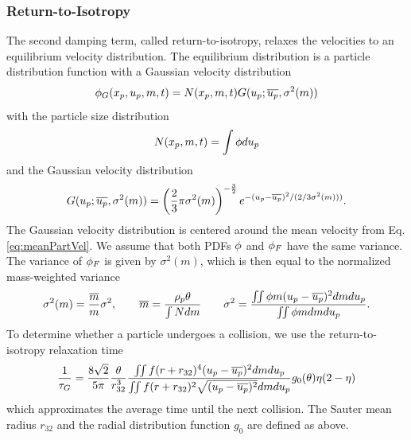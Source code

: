 \subsubsection{Return-to-Isotropy}
\label{sec:isotropy}
The second damping term, called return-to-isotropy, relaxes the velocities to an equilibrium velocity distribution. The equilibrium distribution is a particle distribution function with a Gaussian velocity distribution
\begin{equation*}
    \phi_G(x_p,u_p,m,t) = N(x_p,m,t) G(u_p;\overline{u_p}, \sigma^2(m))
\end{equation*}
with the particle size distribution
\begin{equation*}
    N(x_p,m,t) = \int \phi d u_p
\end{equation*}
and the Gaussian velocity distribution
\begin{equation}
\label{eq:rtiDist}
    G(u_p;\overline{u_p},\sigma^2(m)) = \left( \dfrac{2}{3} \pi \sigma^2(m)\right)^{-\frac{3}{2}} e^{-(u_p - \overline{u_p})^2/(2/3\sigma^2(m)))}.
\end{equation}
The Gaussian velocity distribution is centered around the mean velocity from Eq. \ref{eq:meanPartVel}.
We assume that both PDFs $\phi$ and $\phi_F$ have the same variance. The variance of $\phi_F$ is given by $\sigma^2(m)$, which is then equal to the normalized mass-weighted variance
\begin{equation*}
\sigma^2(m) = \dfrac{\overline{\m}}{\m} \sigma^2, \qquad \overline{\m} = \dfrac{\rp \pvf}{\int N d \m} \qquad \sigma^2 = \dfrac{\MultiIntegral{2} \pd \m (\up - \overline{\up})^2 d \m d \up}{\MultiIntegral{2} \pd \m d \m d \up}.
\end{equation*}
To determine whether a particle undergoes a collision, we use the return-to-isotropy relaxation time
\begin{equation}
\label{eq:DampingTimeG}
\dfrac{1}{\ss_G} = \dfrac{8 \sqrt{2}}{5 \pi} \dfrac{\pvf}{r_{32}^3} \dfrac{\MultiIntegral{2} f (r+ r_{32})^4 (\up - \overline{\up})^2 d \m d \up}{\MultiIntegral{2} f (r + r_{32})^2 \sqrt{(\up - \overline{\up})^2}d \m d \up} g_0(\pvf) \eta (2-\eta)
\end{equation}
which approximates the average time until the next collision. The Sauter mean radius $r_{32}$ and the radial distribution function $g_0$ are defined as above.

